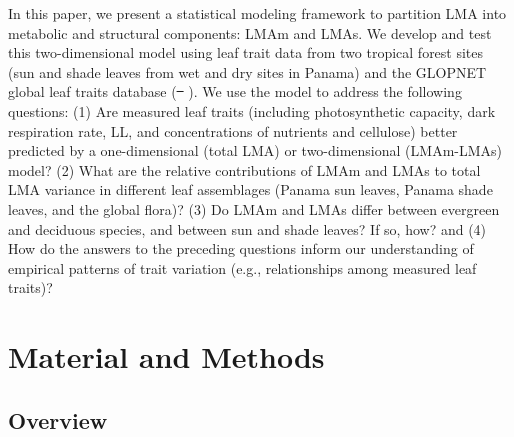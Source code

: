 \documentclass[
  12pt,
  letterpaper,
  DIV=11,
  numbers=noendperiod]{scrartcl}
\providecommand{\DIFadd}[1]{{\protect\color{blue}\uwave{#1}}} %
\providecommand{\DIFdel}[1]{{\protect\color{red}\sout{#1}}}                      %
\providecommand{\DIFaddbegin}{} %
\providecommand{\DIFaddend}{} %
\providecommand{\DIFdelbegin}{} %
\providecommand{\DIFdelend}{} %
\newcommand{\DIFscaledelfig}{0.5}
\newlength{\DIFdelgraphicswidth} %
\newlength{\DIFdelgraphicsheight} %
\newcommand{\DIFaddincludegraphics}[2][]{{\color{blue}\fbox{\DIFOincludegraphics[#1]{#2}}}} %
\newcommand{\DIFdelincludegraphics}[2][]{%
\sbox{\DIFdelgraphicsbox}{\DIFOincludegraphics[#1]{#2}}%
\settoboxwidth{\DIFdelgraphicswidth}{\DIFdelgraphicsbox} %
\settoboxtotalheight{\DIFdelgraphicsheight}{\DIFdelgraphicsbox} %
\scalebox{\DIFscaledelfig}{%
\parbox[b]{\DIFdelgraphicswidth}{\usebox{\DIFdelgraphicsbox}\\[-\baselineskip] \rule{\DIFdelgraphicswidth}{0em}}\llap{\resizebox{\DIFdelgraphicswidth}{\DIFdelgraphicsheight}{%
\setlength{\unitlength}{\DIFdelgraphicswidth}%
\begin{picture}(1,1)%
\thicklines\linethickness{2pt} %
{\color[rgb]{1,0,0}\put(0,0){\framebox(1,1){}}}%
{\color[rgb]{1,0,0}\put(0,0){\line( 1,1){1}}}%
{\color[rgb]{1,0,0}\put(0,1){\line(1,-1){1}}}%
\end{picture}%
}\hspace*{3pt}}} %
} %
\DeclareRobustCommand{\DIFaddbegin}{\DIFOaddbegin \let\includegraphics\DIFaddincludegraphics} %
\DeclareRobustCommand{\DIFaddend}{\DIFOaddend \let\includegraphics\DIFOincludegraphics} %
\DeclareRobustCommand{\DIFdelbegin}{\DIFOdelbegin \let\includegraphics\DIFdelincludegraphics} %
\DeclareRobustCommand{\DIFdelend}{\DIFOaddend \let\includegraphics\DIFOincludegraphics} %
\begin{document}
In this paper, we present a statistical modeling framework to partition
LMA into metabolic and structural components: LMAm and LMAs. We develop
and test this two-dimensional \DIFaddbegin \DIFadd{trait space }\DIFaddend model using leaf trait data
from two tropical forest sites (sun and shade leaves from wet and dry
sites in Panama) and the GLOPNET global leaf traits database
(\DIFdelbegin \DIFdel{\mbox{%
\citeproc{ref-Wright2004a}{Wright et al. 2004}}\hspace{0pt}%
}\DIFdelend \DIFaddbegin \DIFadd{\mbox{%
\citeproc{ref-Wright2004a}{Wright et al., 2004}}\hspace{0pt}%
}\DIFaddend ). We use the model to
address the following questions: (1) Are measured leaf traits (including
photosynthetic capacity, dark respiration rate, LL, and concentrations
of nutrients and cellulose) better predicted by a one-dimensional (total
LMA) or two-dimensional (LMAm-LMAs) \DIFaddbegin \DIFadd{trait }\DIFaddend model? (2) What are the
relative contributions of LMAm and LMAs to total LMA variance in
different leaf assemblages (Panama sun leaves, Panama shade leaves, and
the global flora)? (3) Do LMAm and LMAs differ between evergreen and
deciduous species, and between sun and shade leaves? If so, how? and (4)
How do the answers to the preceding questions inform our understanding
of empirical patterns of trait variation (e.g., relationships among
measured leaf traits)?

\section{Material and Methods}\label{material-and-methods}

\subsection{Overview}\label{overview}
\end{document}
